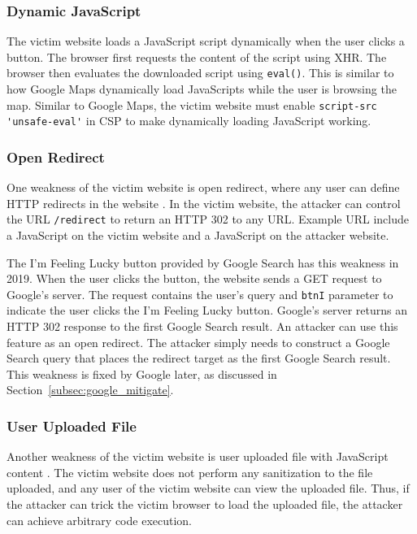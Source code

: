 \documentclass[conference]{IEEEtran}
\begin{document}
\subsubsection{Dynamic JavaScript}

The victim website loads a JavaScript script dynamically when the user clicks a button. The browser first requests the content of the script using XHR. The browser then evaluates the downloaded script using \lstinline{eval()}. This is similar to how Google Maps dynamically load JavaScripts while the user is browsing the map. Similar to Google Maps, the victim website must enable \lstinline{script-src 'unsafe-eval'} in CSP to make dynamically loading JavaScript working.

\subsubsection{Open Redirect}

One weakness of the victim website is open redirect, where any user can define HTTP redirects in the website \cite{cwe_open_redir}. In the victim website, the attacker can control the URL \lstinline{/redirect} to return an HTTP 302 to any URL. Example URL include a JavaScript on the victim website and a JavaScript on the attacker website.

The I'm Feeling Lucky button provided by Google Search has this weakness in 2019. When the user clicks the button, the website sends a GET request to Google's server. The request contains the user's query and \lstinline{btnI} parameter to indicate the user clicks the I'm Feeling Lucky button. Google's server returns an HTTP 302 response to the first Google Search result. An attacker can use this feature as an open redirect. The attacker simply needs to construct a Google Search query that places the redirect target as the first Google Search result. This weakness is fixed by Google later, as discussed in Section~\ref{subsec:google_mitigate}.

\subsubsection{User Uploaded File}

Another weakness of the victim website is user uploaded file with JavaScript content \cite{cwe_upload_file}. The victim website does not perform any sanitization to the file uploaded, and any user of the victim website can view the uploaded file. Thus, if the attacker can trick the victim browser to load the uploaded file, the attacker can achieve arbitrary code execution.
\end{document}
